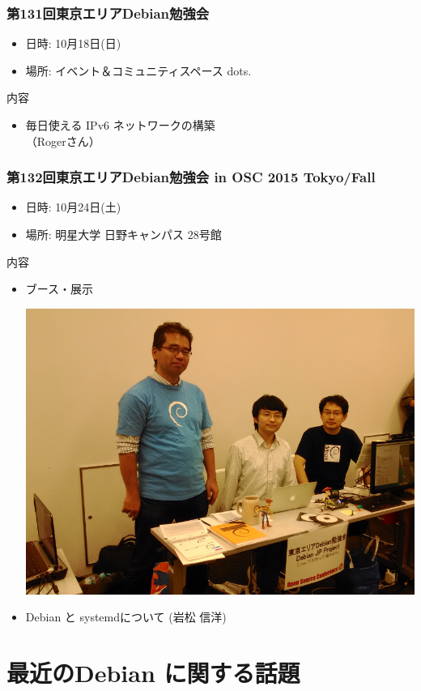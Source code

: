 \documentclass[cjk,dvipdfmx,10pt,compress,%
hyperref={bookmarks=true,bookmarksnumbered=true,bookmarksopen=false,%
colorlinks=false,%
pdftitle={第 103 回 関西 Debian 勉強会},%
pdfauthor={岩松 信洋},%
pdfsubject={資料},%
}]{beamer}
\begin{document}
\begin{frame}[fragile]
  \frametitle{第131回東京エリアDebian勉強会}
  \begin{itemize}
  \item 日時: 10月18日(日)
  \item 場所: イベント＆コミュニティスペース dots.
  \end{itemize}
  \begin{block}{内容}
    \begin{itemize}
    \item 毎日使える IPv6 ネットワークの構築 \\ （Rogerさん）
    \end{itemize}
  \end{block}
\end{frame}

\begin{frame}[fragile]
  \frametitle{第132回東京エリアDebian勉強会 in OSC 2015 Tokyo/Fall}
  \begin{itemize}
  \item 日時: 10月24日(土)
  \item 場所: 明星大学 日野キャンパス 28号館 
  \end{itemize}
  \begin{block}{内容}
    \begin{itemize}
    \item ブース・展示
    \begin{center}
    \includegraphics[width=0.4\hsize]{image201511/osc2015-tokyo-fall.png}
    \end{center}
    \item Debian と systemdについて (岩松 信洋)
    \end{itemize}
  \end{block}
\end{frame}

\section{最近のDebian に関する話題}
\end{document}
